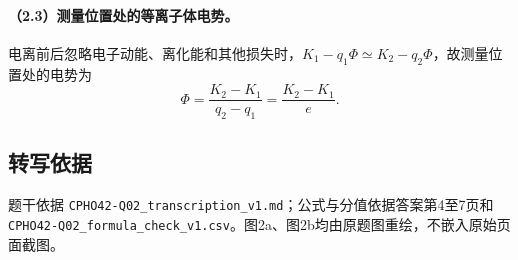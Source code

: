 \paragraph{（2.3）测量位置处的等离子体电势。}
电离前后忽略电子动能、离化能和其他损失时，$K_1-q_1\Phi\simeq K_2-q_2\Phi$，故测量位置处的电势为
\[\boxed{\Phi=\frac{K_2-K_1}{q_2-q_1}=\frac{K_2-K_1}{e}}.\]
\subsection{转写依据}
题干依据 \texttt{CPHO42-Q02\_transcription\_v1.md}；公式与分值依据答案第4至7页和 \texttt{CPHO42-Q02\_formula\_check\_v1.csv}。图2a、图2b均由原题图重绘，不嵌入原始页面截图。
